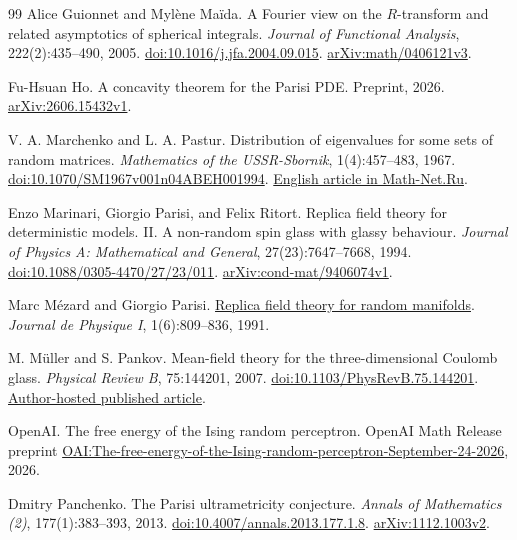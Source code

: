 \begin{thebibliography}{99}
Alice Guionnet and Myl\`ene Ma\"ida.
A Fourier view on the $R$-transform and related asymptotics of spherical
integrals.
\emph{Journal of Functional Analysis}, 222(2):435--490, 2005.
\href{https://doi.org/10.1016/j.jfa.2004.09.015}{doi:10.1016/j.jfa.2004.09.015}.
\href{https://arxiv.org/abs/math/0406121v3}{arXiv:math/0406121v3}.

Fu-Hsuan Ho.
A concavity theorem for the Parisi PDE.
Preprint, 2026.
\href{https://arxiv.org/abs/2606.15432v1}{arXiv:2606.15432v1}.

V. A. Marchenko and L. A. Pastur.
Distribution of eigenvalues for some sets of random matrices.
\emph{Mathematics of the USSR-Sbornik}, 1(4):457--483, 1967.
\href{https://doi.org/10.1070/SM1967v001n04ABEH001994}{doi:10.1070/SM1967v001n04ABEH001994}.
\href{https://www.mathnet.ru/eng/sm4101}{English article in Math-Net.Ru}.

Enzo Marinari, Giorgio Parisi, and Felix Ritort.
Replica field theory for deterministic models. II. A non-random spin glass with glassy behaviour.
\emph{Journal of Physics A: Mathematical and General}, 27(23):7647--7668, 1994.
\href{https://doi.org/10.1088/0305-4470/27/23/011}{doi:10.1088/0305-4470/27/23/011}.
\href{https://arxiv.org/abs/cond-mat/9406074v1}{arXiv:cond-mat/9406074v1}.

Marc M\'ezard and Giorgio Parisi.
\href{https://www.marcmezard.fr/wp-content/uploads/2019/01/91_MP_JDPI.pdf}{Replica field theory for random manifolds}.
\emph{Journal de Physique I}, 1(6):809--836, 1991.

M. M\"uller and S. Pankov.
Mean-field theory for the three-dimensional Coulomb glass.
\emph{Physical Review B}, 75:144201, 2007.
\href{https://doi.org/10.1103/PhysRevB.75.144201}{doi:10.1103/PhysRevB.75.144201}.
\href{https://users.ictp.it/~markusm/Papers/EG_PRB.pdf}{Author-hosted published article}.

OpenAI.
The free energy of the Ising random perceptron.
OpenAI Math Release preprint
\href{https://github.com/openai/math/blob/main/preprints/The-free-energy-of-the-Ising-random-perceptron-September-24-2026/The-free-energy-of-the-Ising-random-perceptron-September-24-2026.pdf}{OAI:The-free-energy-of-the-Ising-random-perceptron-September-24-2026},
2026.

Dmitry Panchenko.
The Parisi ultrametricity conjecture.
\emph{Annals of Mathematics (2)}, 177(1):383--393, 2013.
\href{https://doi.org/10.4007/annals.2013.177.1.8}{doi:10.4007/annals.2013.177.1.8}.
\href{https://arxiv.org/abs/1112.1003v2}{arXiv:1112.1003v2}.


\end{thebibliography}
